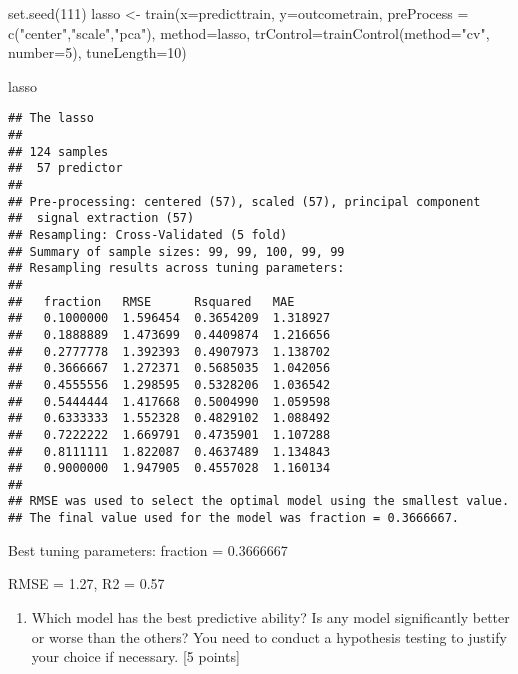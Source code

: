 \documentclass[
]{article}
\newenvironment{Shaded}{\begin{snugshade}}{\end{snugshade}}
\newcommand{\AttributeTok}[1]{\textcolor[rgb]{0.77,0.63,0.00}{#1}}
\newcommand{\DecValTok}[1]{\textcolor[rgb]{0.00,0.00,0.81}{#1}}
\newcommand{\FunctionTok}[1]{\textcolor[rgb]{0.00,0.00,0.00}{#1}}
\newcommand{\NormalTok}[1]{#1}
\newcommand{\OtherTok}[1]{\textcolor[rgb]{0.56,0.35,0.01}{#1}}
\newcommand{\StringTok}[1]{\textcolor[rgb]{0.31,0.60,0.02}{#1}}
\providecommand{\tightlist}{%
  \setlength{\itemsep}{0pt}\setlength{\parskip}{0pt}}
\begin{document}
\begin{Shaded}
\begin{Highlighting}[]
\FunctionTok{set.seed}\NormalTok{(}\DecValTok{111}\NormalTok{)}
\NormalTok{lasso }\OtherTok{\textless{}{-}} \FunctionTok{train}\NormalTok{(}\AttributeTok{x=}\NormalTok{predicttrain,}
               \AttributeTok{y=}\NormalTok{outcometrain,}
               \AttributeTok{preProcess =} \FunctionTok{c}\NormalTok{(}\StringTok{"center"}\NormalTok{,}\StringTok{"scale"}\NormalTok{,}\StringTok{"pca"}\NormalTok{),}
               \AttributeTok{method=}\StringTok{\textquotesingle{}lasso\textquotesingle{}}\NormalTok{,}
               \AttributeTok{trControl=}\FunctionTok{trainControl}\NormalTok{(}\AttributeTok{method=}\StringTok{"cv"}\NormalTok{, }\AttributeTok{number=}\DecValTok{5}\NormalTok{),}
               \AttributeTok{tuneLength=}\DecValTok{10}\NormalTok{)}

\NormalTok{lasso}
\end{Highlighting}
\end{Shaded}

\begin{verbatim}
## The lasso 
## 
## 124 samples
##  57 predictor
## 
## Pre-processing: centered (57), scaled (57), principal component
##  signal extraction (57) 
## Resampling: Cross-Validated (5 fold) 
## Summary of sample sizes: 99, 99, 100, 99, 99 
## Resampling results across tuning parameters:
## 
##   fraction   RMSE      Rsquared   MAE     
##   0.1000000  1.596454  0.3654209  1.318927
##   0.1888889  1.473699  0.4409874  1.216656
##   0.2777778  1.392393  0.4907973  1.138702
##   0.3666667  1.272371  0.5685035  1.042056
##   0.4555556  1.298595  0.5328206  1.036542
##   0.5444444  1.417668  0.5004990  1.059598
##   0.6333333  1.552328  0.4829102  1.088492
##   0.7222222  1.669791  0.4735901  1.107288
##   0.8111111  1.822087  0.4637489  1.134843
##   0.9000000  1.947905  0.4557028  1.160134
## 
## RMSE was used to select the optimal model using the smallest value.
## The final value used for the model was fraction = 0.3666667.
\end{verbatim}

Best tuning parameters: fraction = 0.3666667

RMSE = 1.27, R2 = 0.57

\begin{enumerate}
\def\labelenumi{(\alph{enumi})}
\setcounter{enumi}{2}
\tightlist
\item
  Which model has the best predictive ability? Is any model
  significantly better or worse than the others? You need to conduct a
  hypothesis testing to justify your choice if necessary. {[}5 points{]}
\end{enumerate}
\end{document}
